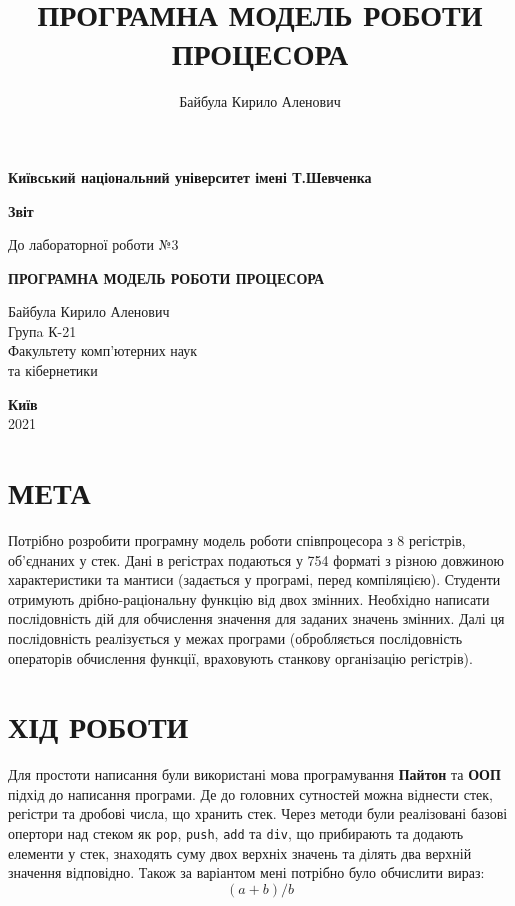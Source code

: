 \documentclass[a4paper,12pt]{report}
\author{Байбула Кирило Аленович}
\title{ПРОГРАМНА МОДЕЛЬ РОБОТИ ПРОЦЕСОРА}
\begin{document}
\begin{titlepage}
	\begin{center}
		\Large
		\textbf{Київський національний університет імені Т.Шевченка}
		\vspace{5cm}

		\Huge
		\textbf{Звіт}

		\LARGE
		До лабораторної роботи №3
		\vspace{0.5cm}

		\textbf{ПРОГРАМНА МОДЕЛЬ РОБОТИ ПРОЦЕСОРА}
		\vfill
	\end{center}

	\begin{FlushRight}
		Байбула Кирило Аленович \\
		Групa К-21 \\
		Факультету комп’ютерних наук \\
		та кібернетики
	\end{FlushRight}

	\vspace{0.5cm}

	\begin{center}
		\textbf{Київ} \\
		2021
	\end{center}

\end{titlepage}
\clearpage


\section{МЕТА}
Потрібно розробити програмну модель роботи співпроцесора з 8 регістрів,
об'єднаних у стек. Дані в регістрах подаються у 754 форматі з різною
довжиною характеристики та мантиси (задається у програмі, перед компіляцією).
Студенти отримують дрібно-раціональну функцію від двох змінних. Необхідно
написати послідовність дій для обчислення значення для заданих значень
змінних. Далі ця послідовність реалізується у межах програми 
(обробляється послідовність операторів обчислення функції, враховують
станкову організацію регістрів).

\section{ХІД РОБОТИ}
Для простоти написання були використані мова програмування \textbf{Пайтон}
та \textbf{ООП} підхід до написання програми. Де до головних сутностей можна віднести
стек, регістри та дробові числа, що хранить стек. Через методи були реалізовані
базові опертори над стеком як \verb|pop|, \verb|push|, \verb|add| та \verb|div|,
що прибирають та додають елементи у стек, знаходять суму двох верхніх значень
та ділять два верхній значення відповідно. Також за варіантом мені потрібно
було обчислити вираз:
     \[(a+b)/b\]
\end{document}
